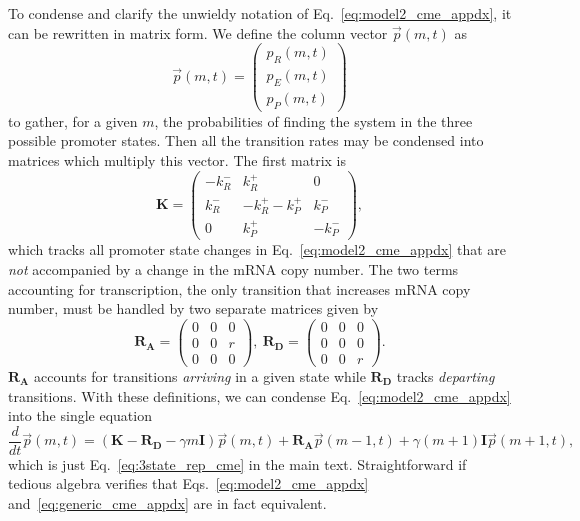 To condense and clarify the unwieldy notation of Eq.~\ref{eq:model2_cme_appdx},
it can be rewritten in matrix form. We define the column vector $\vec{p}(m,t)$
as
\begin{equation}
\vec{p}(m,t)
= \begin{pmatrix} p_R(m,t) \\ p_E(m,t) \\ p_P(m,t) \end{pmatrix}
\end{equation}
to gather, for a given $m$, the probabilities of finding the system in the three
possible promoter states. Then all the transition rates may be condensed into
matrices which multiply this vector. The first matrix is
\begin{equation}
\mathbf{K} = \begin{pmatrix} -k_R^- & k_R^+ & 0 \\
                        k_R^- & -k_R^+ -k_P^+ & k_P^- \\
                        0 & k_P^+ & -k_P^- 
                \end{pmatrix},
\end{equation}
which tracks all promoter state changes in Eq.~\ref{eq:model2_cme_appdx} that
are \textit{not} accompanied by a change in the mRNA copy number. The two terms
accounting for transcription, the only transition that increases mRNA copy
number, must be handled by two separate matrices given by
\begin{equation}
\mathbf{R_A} = \begin{pmatrix}
                0 & 0 & 0 \\ 
                0 & 0 & r \\ 
                0 & 0 & 0
                \end{pmatrix},\
\mathbf{R_D} = \begin{pmatrix}
                0 & 0 & 0 \\ 
                0 & 0 & 0 \\ 
                0 & 0 & r
                \end{pmatrix}.
\end{equation}
$\mathbf{R_A}$ accounts for transitions \textit{arriving} in a given state while
$\mathbf{R_D}$ tracks \textit{departing} transitions. With these definitions, we
can condense Eq.~\ref{eq:model2_cme_appdx} into the single equation
\begin{equation}
\frac{d}{dt} \vec{p}(m,t) =
\left( \mathbf{K} - \mathbf{R_D} - \gamma m \mathbf{I} \right) \vec{p}(m,t)
                + \mathbf{R_A} \vec{p}(m-1,t) +
                \gamma (m+1) \mathbf{I} \vec{p}(m+1,t),
\label{eq:generic_cme_appdx}
\end{equation}
which is just Eq.~\ref{eq:3state_rep_cme} in the main text. Straightforward if
tedious algebra verifies that Eqs.~\ref{eq:model2_cme_appdx}
and~\ref{eq:generic_cme_appdx} are in fact equivalent.

